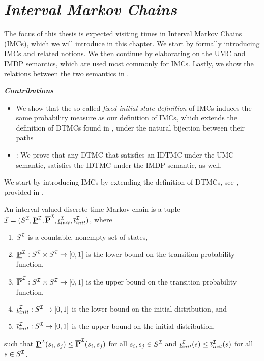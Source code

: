 \chapter{\textit{Interval Markov Chains}}
\label{ch:Interval Markov Chains}

The focus of this thesis is expected visiting times in Interval Markov Chains (IMCs), which we will introduce in this chapter. We start by formally introducing IMCs and related notions. We then continue by elaborating on the UMC and IMDP semantics, which are used most commonly for IMCs. Lastly, we show the relations between the two semantics in .

\emph{\textbf{Contributions}}
\begin{itemize}
    \item We show that the so-called \textit{fixed-initial-state definition} of IMCs induces the same probability measure as our definition of IMCs, which extends the definition of DTMCs found in \cite{Bibel}, under the natural bijection between their paths
    \item {}: We prove that any DTMC that satisfies an IDTMC under the UMC semantic, satisfies the IDTMC under the IMDP semantic, as well.
\end{itemize}
 
We start by introducing IMCs by extending the definition of DTMCs, see , provided in \cite{Bibel}.
\begin{definition}\label{def:IMC}
    An interval-valued discrete-time Markov chain is a tuple
    $\mathcal{I}=(S^{\mathcal{I}},\mathbf{\underline{P}}^{\mathcal{I}},\mathbf{\overline{P}}^{\mathcal{I}},\mathbf{\underline{\iota}}_{init}^{\mathcal{I}},\mathbf{\overline{\iota}}_{init}^{\mathcal{I}})$, where
    \begin{enumerate}[label=(\roman*)]
        \item $S^{\mathcal{I}}$ is a countable, nonempty set of states,
        \item $\mathbf{\underline{P}}^{\mathcal{I}}: S^{\mathcal{I}} \times S^{\mathcal{I}} \rightarrow [0,1]$ is the lower bound on the transition probability function,
        \item $\mathbf{\overline{P}}^{\mathcal{I}}: S^{\mathcal{I}} \times S^{\mathcal{I}} \rightarrow [0,1]$ is the upper bound on the transition probability function,
        \item $\mathbf{\underline{\iota}}_{init}^{\mathcal{I}}: S^{\mathcal{I}} \rightarrow [0,1]$ is the lower bound on the initial distribution, and
        \item $\mathbf{\overline{\iota}}_{init}^{\mathcal{I}}: S^{\mathcal{I}} \rightarrow [0,1]$ is the upper bound on the initial distribution,
    \end{enumerate}
    such that $\mathbf{\underline{P}}^{\mathcal{I}}(s_i,s_j) \leq \mathbf{\overline{P}}^{\mathcal{I}}(s_i,s_j)$ for all $s_i,s_j\in S^{\mathcal{I}}$ and $\mathbf{\underline{\iota}}_{init}^{\mathcal{I}}(s) \leq \mathbf{\overline{\iota}}_{init}^{\mathcal{I}}(s)$ for all $s\in S^{\mathcal{I}}$.
\end{definition}

